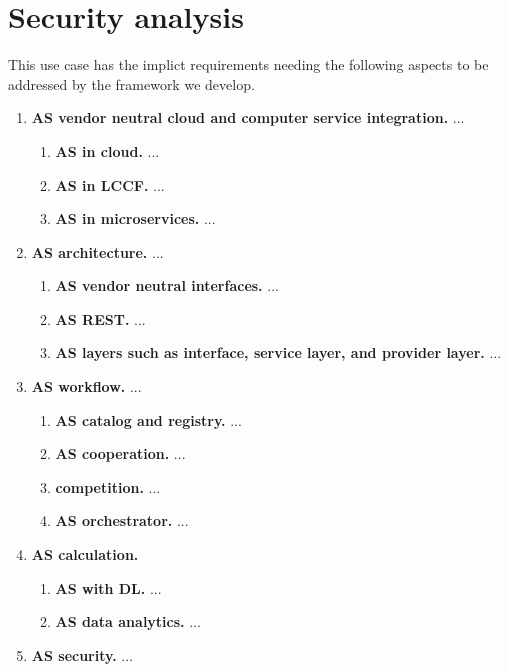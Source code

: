 \section{Security analysis}



This use case has the implict requirements needing the following
aspects to be addressed by the framework we develop.

\begin{enumerate}

\item{\bf AS vendor neutral cloud and computer service integration.} ...

  \begin{enumerate}
  \item {\bf AS in cloud.} ...
  \item {\bf AS in LCCF.} ...
  \item {\bf AS in microservices.} ...
  \end{enumerate}

\item{\bf AS architecture.} ...

  \begin{enumerate}
  \item{\bf AS vendor neutral interfaces.} ...
  \item{\bf AS REST.} ...
  \item{\bf AS layers such as interface, service layer, and provider layer.} ...
  \end{enumerate}

\item{\bf AS workflow.} ...

  \begin{enumerate}
  \item{\bf AS catalog and registry.} ...
  \item{\bf AS cooperation.} ...
  \item{\bf competition.} ...
  \item{\bf AS orchestrator.} ...
  \end{enumerate}


\item{\bf AS calculation.}

  \begin{enumerate}
  \item{\bf AS with DL.} ...
  \item{\bf AS data analytics.} ...
  \end{enumerate}

\item{\bf AS security.} ...

\end{enumerate}
